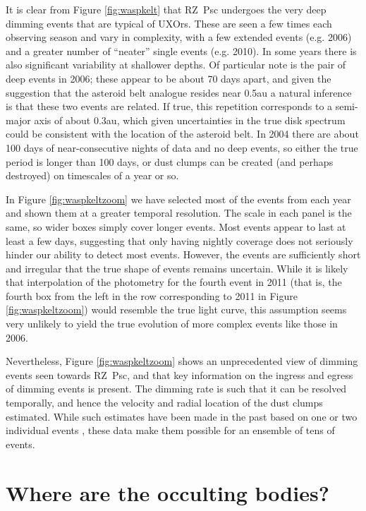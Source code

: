 \documentclass[useAMS,usenatbib,usegraphicx]{mn2e}
\begin{document}
It is clear from Figure \ref{fig:waspkelt} that RZ~Psc undergoes the very deep dimming
events that are typical of UXOrs. These are seen a few times each observing season and
vary in complexity, with a few extended events (e.g. 2006) and a greater number of
``neater'' single events (e.g. 2010). In some years there is also significant variability
at shallower depths. Of particular note is the pair of deep events in 2006; these appear
to be about 70 days apart, and given the suggestion that the asteroid belt analogue
resides near 0.5au a natural inference is that these two events are related. If true,
this repetition corresponds to a semi-major axis of about 0.3au, which given
uncertainties in the true disk spectrum could be consistent with the location of the
asteroid belt. In 2004 there are about 100 days of near-consecutive nights of data and no
deep events, so either the true period is longer than 100 days, or dust clumps can be
created (and perhaps destroyed) on timescales of a year or so.

In Figure \ref{fig:waspkeltzoom} we have selected most of the events from each year and
shown them at a greater temporal resolution. The scale in each panel is the same, so
wider boxes simply cover longer events. Most events appear to last at least a few days,
suggesting that only having nightly coverage does not seriously hinder our ability to
detect most events. However, the events are sufficiently short and irregular that the
true shape of events remains uncertain. While it is likely that interpolation of the
photometry for the fourth event in 2011 (that is, the fourth box from the left in the row
corresponding to 2011 in Figure \ref{fig:waspkeltzoom}) would resemble the true light
curve, this assumption seems very unlikely to yield the true evolution of more complex
events like those in 2006.

Nevertheless, Figure \ref{fig:waspkeltzoom} shows an unprecedented view of dimming events
seen towards RZ~Psc, and that key information on the ingress and egress of dimming events
is present. The dimming rate is such that it can be resolved temporally, and hence the
velocity and radial location of the dust clumps estimated. While such estimates have been
made in the past based on one or two individual events \citep{1985PZ.....22..181Z}, these
data make them possible for an ensemble of tens of events.

\section{Where are the occulting bodies?}\label{s:where}
\end{document}
